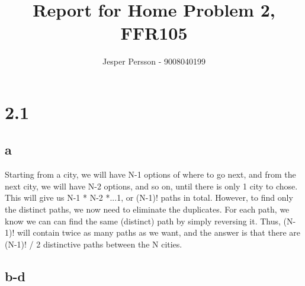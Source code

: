 \documentclass{article}
\title{Report for Home Problem 2, FFR105}
\author{Jesper Persson - 9008040199}
\begin{document}
 
\maketitle

\section{2.1}

\subsection{a}

Starting from a city, we will have N-1 options of where to go next, and from the next city, we will have N-2 options, and so on, until there is only 1 city to chose. This will give us N-1 * N-2 *...1, or (N-1)! paths in total. However, to find only the distinct paths, we now need to eliminate the duplicates. For each path, we know we can can find the same (distinct) path by simply reversing it. Thus, (N-1)! will contain twice as many paths as we want, and the answer is that there are (N-1)! / 2 distinctive paths between the N cities.

\subsection{b-d}
\end{document}
